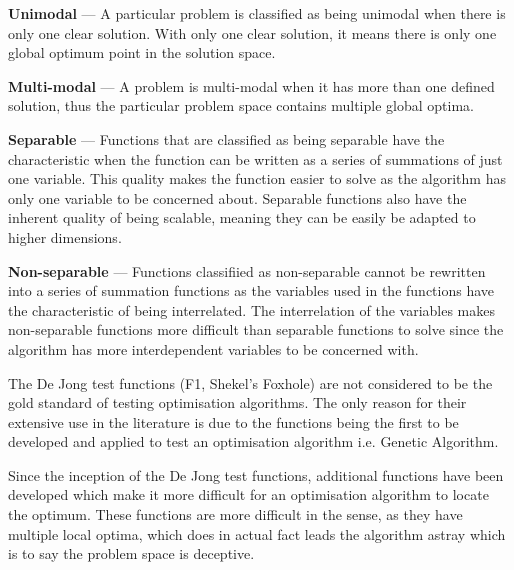 \begin{description}
\item{\textbf{Unimodal}} --- A particular problem is classified as being unimodal when there is only one clear solution. With only one clear solution, it means there is only one global optimum point in the solution space\cite{evalevoalgo,numericalABC,FundamentalSwarm,CompuIntelligenceIntro}.
\item{\textbf{Multi-modal}} --- A problem is multi-modal when it has more than one defined solution, thus the particular problem space contains multiple global optima\cite{evalevoalgo,numericalABC,FundamentalSwarm,CompuIntelligenceIntro}.
\item{\textbf{Separable}} --- Functions that are classified as being separable have the characteristic when the function can be written as a series of summations of just one variable\cite{numericalABC}. This quality makes the function easier to solve as the algorithm has only one variable to be concerned about\cite{evalevoalgo,numericalABC}. Separable functions also have the inherent quality of being scalable, meaning they can be easily be adapted to higher dimensions\cite{evalevoalgo,numericalABC}.
\item{\textbf{Non-separable}} --- Functions classifiied as non-separable cannot be rewritten into a series of summation functions as the variables used in the functions have the characteristic of being interrelated\cite{evalevoalgo,numericalABC}. The interrelation of the variables makes non-separable functions more difficult than separable functions to solve since the algorithm has more interdependent variables to be concerned with\cite{evalevoalgo,numericalABC}.
\end{description}

The De Jong test functions (F1, Shekel's Foxhole) are not considered to be the gold standard of testing optimisation algorithms\cite{evalevoalgo}. The only reason for their extensive use in the literature is due to the functions being the first to be developed and applied to test an optimisation algorithm i.e. Genetic Algorithm\cite{devparallelgasa,evalevoalgo}.

Since the inception of the De Jong test functions, additional functions have been developed which make it more difficult for an optimisation algorithm to locate the optimum\cite{evalevoalgo}. These functions are more difficult in the sense, as they have multiple local optima, which does in actual fact leads the algorithm astray which is to say the problem space is deceptive\cite{CompuIntelligenceIntro,FundamentalSwarm,evalevoalgo}. 

